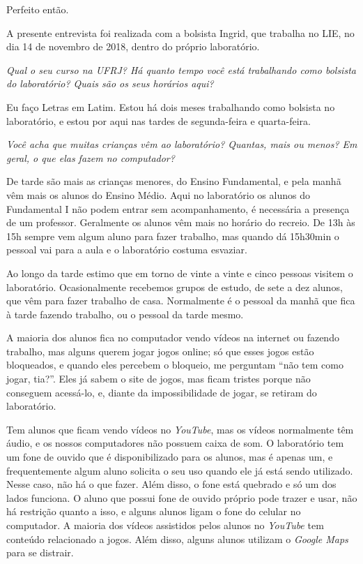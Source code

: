 Perfeito então.

\label{anx:LABEL_ANX_D}

A presente entrevista foi realizada com a bolsista Ingrid, que trabalha no LIE, no dia 14 de novembro de 2018, dentro do próprio laboratório.

\textit{Qual o seu curso na UFRJ? Há quanto tempo você está trabalhando como bolsista do laboratório? Quais são os seus horários aqui?}

Eu faço Letras em Latim. Estou há dois meses trabalhando como bolsista no laboratório, e estou por aqui nas tardes de segunda-feira e quarta-feira.

\textit{Você acha que muitas crianças vêm ao laboratório? Quantas, mais ou menos? Em geral, o que elas fazem no computador?}

De tarde são mais as crianças menores, do Ensino Fundamental, e pela manhã vêm mais os alunos do Ensino Médio. Aqui no laboratório os alunos do Fundamental I não podem entrar sem acompanhamento, é necessária a presença de um professor. Geralmente os alunos vêm mais no horário do recreio. De 13h às 15h sempre vem algum aluno para fazer trabalho, mas quando dá 15h30min o pessoal vai para a aula e o laboratório costuma esvaziar.

Ao longo da tarde estimo que em torno de vinte a vinte e cinco pessoas visitem o laboratório. Ocasionalmente recebemos grupos de estudo, de sete a dez alunos, que vêm para fazer trabalho de casa. Normalmente é o pessoal da manhã que fica à tarde fazendo trabalho, ou o pessoal da tarde mesmo.

A maioria dos alunos fica no computador vendo vídeos na internet ou fazendo trabalho, mas alguns querem jogar jogos online; só que esses jogos estão bloqueados, e quando eles percebem o bloqueio, me perguntam “não tem como jogar, tia?”. Eles já sabem o site de jogos, mas ficam tristes porque não conseguem acessá-lo, e, diante da impossibilidade de jogar, se retiram do laboratório.

Tem alunos que ficam vendo vídeos no \textit{YouTube}, mas os vídeos normalmente têm áudio, e os nossos computadores não possuem caixa de som. O laboratório tem um fone de ouvido que é disponibilizado para os alunos, mas é apenas um, e frequentemente algum aluno solicita o seu uso quando ele já está sendo utilizado. Nesse caso, não há o que fazer. Além disso, o fone está quebrado e só um dos lados funciona. O aluno que possui fone de ouvido próprio pode trazer e usar, não há restrição quanto a isso, e alguns alunos ligam o fone do celular no computador. A maioria dos vídeos assistidos pelos alunos no \textit{YouTube} tem conteúdo relacionado a jogos. Além disso, alguns alunos utilizam o \textit{Google Maps} para se distrair.

